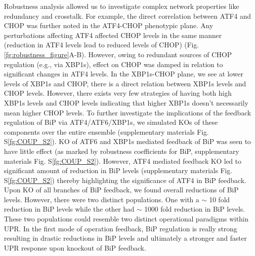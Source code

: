 \documentclass[fleqn,10pt]{wlscirep}
\begin{document}
Robustness analysis allowed us to investigate complex network properties like redundancy and crosstalk. For example, the direct correlation between ATF4 and CHOP was further noted in the ATF4-CHOP phenotypic plane. Any perturbations affecting ATF4 affected CHOP levels in the same manner (reduction in ATF4 levels lead to reduced levels of CHOP) (Fig. \ref{fg:robustness_figure}A-B). However, owing to redundant sources of CHOP regulation (e.g., via XBP1s), effect on CHOP was damped in relation to significant changes in ATF4 levels. In the XBP1s-CHOP plane, we see at lower levels of XBP1s and CHOP, there is a direct relation between XBP1s levels and CHOP levels. However, there exists very few strategies of having both high XBP1s levels and CHOP levels indicating that higher XBP1s doesn't necessarily mean higher CHOP levels. To further investigate the implications of the feedback regulation of BiP via ATF4/ATF6/XBP1s, we simulated KOs of these components over the entire ensemble (supplementary materials Fig. S\ref{fg:COUP_S2}). KO of ATF6 and XBP1s mediated feedback of BiP was seen to have little effect (as marked by robustness coefficients for BiP, supplementary materials Fig. S\ref{fg:COUP_S2}). However, ATF4 mediated feedback KO led to significant amount of reduction in BiP levels (supplementary materials Fig. S\ref{fg:COUP_S2}) thereby highlighting the significance of ATF4 in BiP feedback. Upon KO of all branches of BiP feedback, we found overall reductions of BiP levels. However, there were two distinct populations. One with a $\sim$ 10 fold reduction in BiP levels while the other had $\sim$ 1000 fold reduction in BiP levels. These two populations could resemble two distinct operational paradigms within UPR. In the first mode of operation feedback, BiP regulation is really strong resulting in drastic reductions in BiP levels and ultimately a stronger and faster UPR response upon knockout of BiP feedback. 
\end{document}
